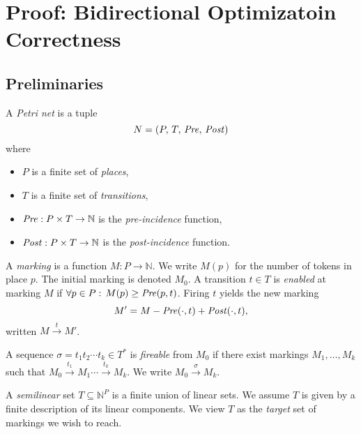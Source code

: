 
\section{Proof: Bidirectional Optimizatoin Correctness}
\label{sec:appendixCBidirectionalProof}





	\subsection{Preliminaries}
	
	\begin{definition}
		A \emph{Petri net} is a tuple
		\[
		N = (P,\,T,\,\mathit{Pre},\,\mathit{Post})
		\]
		where
		\begin{itemize}
			\item $P$ is a finite set of \emph{places},
			\item $T$ is a finite set of \emph{transitions},
			\item $\mathit{Pre}: P\times T \to \mathbb{N}$ is the \emph{pre-incidence} function,
			\item $\mathit{Post}: P\times T \to \mathbb{N}$ is the \emph{post-incidence} function.
		\end{itemize}
	\end{definition}
	
	\begin{definition}[Marking]
		A \emph{marking} is a function $M: P \to \mathbb{N}$. We write $M(p)$
		for the number of tokens in place $p$.  The initial marking is
		denoted $M_0$.  A transition $t\in T$ is \emph{enabled} at marking
		$M$ if $\forall p\in P:\,M(p)\ge\mathit{Pre}(p,t)$.  Firing $t$ yields the
		new marking
		\[
		M' = M - \mathit{Pre}(\cdot,t) + \mathit{Post}(\cdot,t),
		\]
		written $M \xrightarrow{t} M'$.
	\end{definition}
	
	\begin{definition}
		A sequence $\sigma = t_1 t_2 \cdots t_k \in T^*$ is \emph{fireable}
		from $M_0$ if there exist markings $M_1,\dots,M_k$ such that
		$M_0\xrightarrow{t_1}M_1\cdots\xrightarrow{t_k}M_k$.  We write
		$M_0 \xrightarrow{\sigma} M_k$.
	\end{definition}
	
	\begin{definition}
		A \emph{semilinear} set $T\subseteq \mathbb{N}^P$ is a finite union of
		linear sets.  We assume $T$ is given by a finite description of its
		linear components.  We view $T$ as the \emph{target} set of markings
		we wish to reach.
	\end{definition}
	
